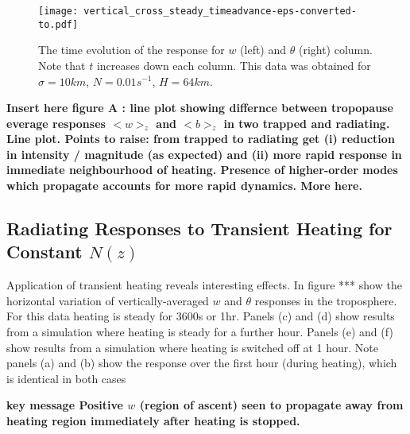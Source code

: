 \documentclass[a4paper,10pt]{article}
\begin{document}
\begin{figure}[h!]
  \centering
    \texttt{[image: vertical\_cross\_steady\_timeadvance-eps-converted-to.pdf]}
  \label{fig_vertical_cross_steady_timeadvance}
  \caption{ The time evolution of the response for $w$ (left) and $\theta$ (right) column.
              Note that $t$ increases down each column. This data was obtained for $\sigma =10km$, $N= 0.01s^{-1}$, $H = 64km$.  }
\end{figure}

{\bf Insert here figure A : line plot showing differnce between tropopause everage responses $<w>_z$ and $<b>_z$ in two trapped and radiating. Line plot.
Points to raise: from trapped to radiating get (i) reduction in intensity / magnitude (as expected) and (ii) more rapid response in immediate neighbourhood of heating.
Presence of higher-order modes which propagate accounts for more rapid dynamics. More here. }
%
%
\FloatBarrier
%
%
%
%
\subsection{Radiating Responses to Transient Heating for Constant $N(z)$}
%
Application of transient heating reveals interesting effects.  In figure *** show the horizontal variation of vertically-averaged $w$ and $\theta$ responses in the troposphere. For this data heating is steady for 3600s or 1hr.  
Panels (c) and (d) show results from a simulation where heating is steady for a further hour. Panels (e) and (f) show results from a simulation where heating is switched off at 1 hour. 
Note panels (a) and (b) show the response over the first hour (during heating), which is identical in both cases

{ \bf key message Positive $w$ (region of ascent) seen to propagate away from heating region immediately after heating is stopped. }
\end{document}
